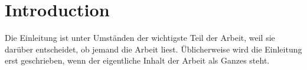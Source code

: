 
\chapter{Introduction}

Die Einleitung ist unter Umständen der wichtigste Teil der Arbeit, weil sie darüber entscheidet, ob jemand die Arbeit liest. Üblicherweise wird die Einleitung erst geschrieben, wenn der eigentliche Inhalt der Arbeit als Ganzes steht.

